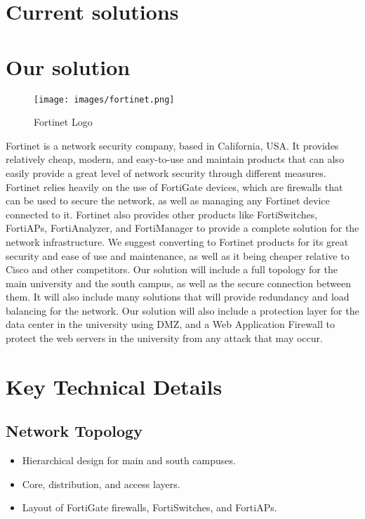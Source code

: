 \documentclass[12pt]{report}
\begin{document}
\section{Current solutions}
\section{Our solution}
\begin{figure}[h]
    \centering
    \texttt{[image: images/fortinet.png]}
    \caption{Fortinet Logo}
    \label{fig:fortinet logo}
\end{figure}
Fortinet is a network security company, based in California, USA. It provides relatively cheap, modern, and easy-to-use and maintain products that can also easily provide a great level of network security through different measures. Fortinet relies heavily on the use of FortiGate devices, which are firewalls that can be used to secure the network, as well as managing any Fortinet device connected to it. Fortinet also provides other products like FortiSwitches, FortiAPs, FortiAnalyzer, and FortiManager to provide a complete solution for the network infrastructure. 
We suggest converting to Fortinet products for its great security and ease of use and maintenance, as well as it being cheaper relative to Cisco and other competitors.
Our solution will include a full topology for the main university and the south campus, as well as the secure connection between them. It will also include many solutions that will provide redundancy and load balancing for the network.
Our solution will also include a protection layer for the data center in the university using DMZ, and a Web Application Firewall to protect the web servers in the university from any attack that may occur.
\section{Key Technical Details}

\subsection{Network Topology}
\begin{itemize}
    \item Hierarchical design for main and south campuses.
    \item Core, distribution, and access layers.
    \item Layout of FortiGate firewalls, FortiSwitches, and FortiAPs.
\end{itemize}
\end{document}

